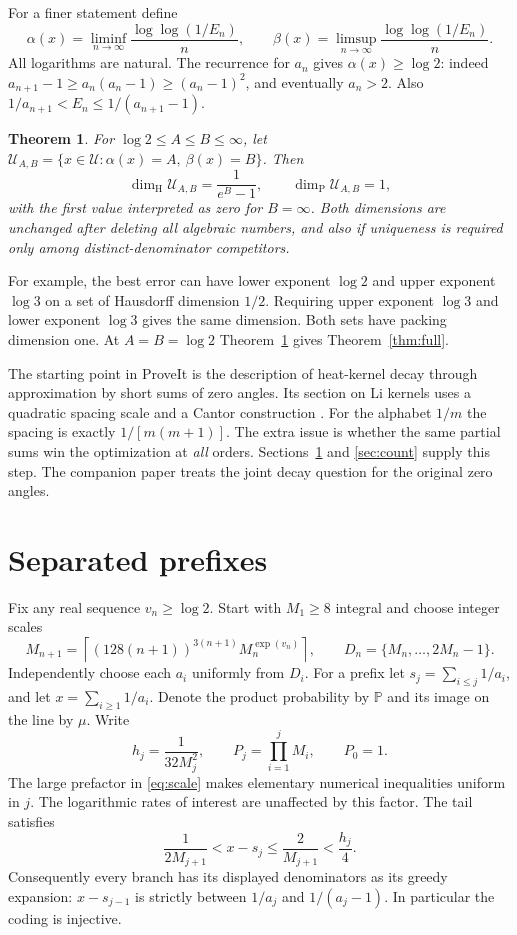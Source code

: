 \documentclass[11pt]{article}
\newtheorem{theorem}{Theorem}[section]\newtheorem{lemma}[theorem]{Lemma}\newtheorem{corollary}[theorem]{Corollary}\newtheorem{proposition}[theorem]{Proposition}
\newcommand{\HH}{\dim_{\mathrm H}}\newcommand{\PP}{\dim_{\mathrm P}}\newcommand{\U}{\mathcal U}\newcommand{\N}{\mathbb N}
\begin{document}
For a finer statement define
\[
 \alpha(x)=\liminf_{n\to\infty}\frac{\log\log(1/E_n)}n,
 \qquad \beta(x)=\limsup_{n\to\infty}\frac{\log\log(1/E_n)}n.
\]
All logarithms are natural. The recurrence for $a_n$ gives $\alpha(x)\ge\log 2$: indeed $a_{n+1}-1\ge a_n(a_n-1)\ge(a_n-1)^2$, and eventually $a_n>2$. Also $1/a_{n+1}<E_n\le1/(a_{n+1}-1)$.

\begin{theorem}\label{thm:spectrum}
For $\log 2\le A\le B\le\infty$, let $\U_{A,B}=\{x\in\U:\alpha(x)=A,\ \beta(x)=B\}$. Then
\[
  \HH\U_{A,B}=\frac1{e^B-1},\qquad \PP\U_{A,B}=1,
\]
with the first value interpreted as zero for $B=\infty$. Both dimensions are unchanged after deleting all algebraic numbers, and also if uniqueness is required only among distinct-denominator competitors.
\end{theorem}

For example, the best error can have lower exponent $\log 2$ and upper exponent $\log 3$ on a set of Hausdorff dimension $1/2$. Requiring upper exponent $\log 3$ and lower exponent $\log 3$ gives the same dimension. Both sets have packing dimension one. At $A=B=\log 2$ Theorem~\ref{thm:spectrum} gives Theorem~\ref{thm:full}.

The starting point in ProveIt is the description of heat-kernel decay through approximation by short sums of zero angles. Its section on Li kernels uses a quadratic spacing scale and a Cantor construction \cite{repo}. For the alphabet $1/m$ the spacing is exactly $1/[m(m+1)]$. The extra issue is whether the same partial sums win the optimization at \emph{all} orders. Sections~\ref{sec:tree} and \ref{sec:count} supply this step. The companion paper treats the joint decay question for the original zero angles.

\section{Separated prefixes}\label{sec:tree}
Fix any real sequence $v_n\ge\log 2$. Start with $M_1\ge 8$ integral and choose integer scales
\begin{equation}\label{eq:scale}
 M_{n+1}=\left\lceil (128(n+1))^{3(n+1)} M_n^{\exp(v_n)}\right\rceil,
 \qquad D_n=\{M_n,\dots,2M_n-1\}.
\end{equation}
Independently choose each $a_i$ uniformly from $D_i$. For a prefix let $s_j=\sum_{i\le j}1/a_i$, and let $x=\sum_{i\ge1}1/a_i$. Denote the product probability by $\mathbb P$ and its image on the line by $\mu$. Write
\[
 h_j=\frac1{32M_j^2},\qquad P_j=\prod_{i=1}^j M_i,\qquad P_0=1.
\]
The large prefactor in \eqref{eq:scale} makes elementary numerical inequalities uniform in $j$. The logarithmic rates of interest are unaffected by this factor. The tail satisfies
\begin{equation}\label{eq:tail}
 \frac{1}{2M_{j+1}}< x-s_j \le \frac2{M_{j+1}}<\frac{h_j}{4}.
\end{equation}
Consequently every branch has its displayed denominators as its greedy expansion: $x-s_{j-1}$ is strictly between $1/a_j$ and $1/(a_j-1)$. In particular the coding is injective.
\end{document}
